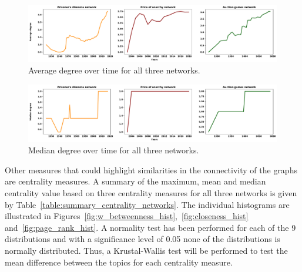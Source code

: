 \documentclass{article}
\begin{document}
\begin{figure}[!hbtp]
    \centering
    \includegraphics[width=\textwidth]{./assets/images/average_degrees_lineplots.pdf}
    \caption{Average degree over time for all three networks.}
    \label{fig:av_degrees_over_time}
\end{figure}

\begin{figure}[!hbtp]
    \centering
    \includegraphics[width=\textwidth]{./assets/images/median_degrees_lineplots.pdf}
    \caption{Median degree over time for all three networks.}
    \label{fig:md_degrees_over_time}
\end{figure}

Other measures that could highlight similarities in the connectivity of the graphs
are centrality measures. A summary of the maximum, mean and median centrality
value based on three centrality measures for all three networks is given by 
Table~\ref{table:summary_centrality_networks}. The individual histograms 
are illustrated in Figures~\ref{fig:w_betweenness_hist},~\ref{fig:closeness_hist}
and~\ref{fig:page_rank_hist}. A normality test has been performed for each of the
9 distributions and with a significance level of 0.05 none of the distributions
is normally distributed. Thus, a Krustal-Wallis test will be performed to test
the mean difference between the topics for each centrality measure.
\end{document}

